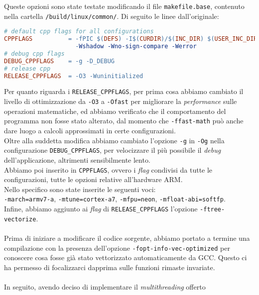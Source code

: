Queste opzioni sono state testate modificando il file \verb|makefile.base|, 
contenuto nella cartella \verb|/build/linux/common/|. Di seguito le linee 
dall'originale: 

\begin{lstlisting}[language=make]
# default cpp flags for all configurations
CPPFLAGS          = -fPIC $(DEFS) -I$(CURDIR)/$(INC_DIR) $(USER_INC_DIRS) -Wall
                    -Wshadow -Wno-sign-compare -Werror
# debug cpp flags
DEBUG_CPPFLAGS    = -g -D_DEBUG
# release cpp
RELEASE_CPPFLAGS  = -O3 -Wuninitialized
\end{lstlisting}

Per quanto riguarda i \verb|RELEASE_CPPFLAGS|, per prima cosa abbiamo cambiato 
il livello di ottimizzazione da \verb|-O3| a \verb|-Ofast| per migliorare la 
\emph{performance} sulle operazioni matematiche, ed abbiamo verificato che il 
comportamento del programma non fosse stato alterato, dal momento che 
\verb|-ffast-math| può anche dare luogo a calcoli approssimati in certe 
configurazioni.\\
Oltre alla suddetta modifica abbiamo cambiato l'opzione \verb|-g| in \verb|-Og| 
nella configurazione \verb|DEBUG_CPPFLAGS|, per velocizzare il più possibile il 
\emph{debug} dell'applicazione, altrimenti sensibilmente lento.\\
Abbiamo poi inserito in \verb|CPPFLAGS|, ovvero i \emph{flag} condivisi da 
tutte le configurazioni, tutte le opzioni relative all'hardware ARM.\\
Nello specifico sono state inserite le seguenti voci:\\ \verb|-march=armv7-a|, 
\verb|-mtune=cortex-a7|, \verb|-mfpu=neon|, \verb|-mfloat-abi=softfp|.\\
Infine, abbiamo aggiunto ai \emph{flag} di \verb|RELEASE_CPPFLAGS| 
l'opzione \verb|-ftree-vectorize|.
\\ \\
Prima di iniziare a modificare il codice sorgente, abbiamo portato a termine 
una compilazione con la presenza dell'opzione \verb|-fopt-info-vec-optimized| 
per conoscere cosa fosse già stato vettorizzato automaticamente da GCC. Questo 
ci ha permesso di focalizzarci dapprima sulle funzioni rimaste invariate.
\\ \\
In seguito, avendo deciso di implementare il \emph{multithreading} offerto 
